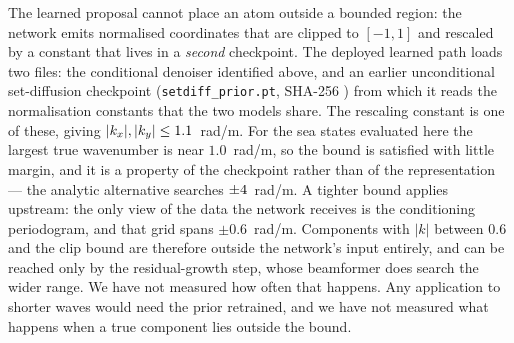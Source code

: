 \documentclass[review]{elsarticle}
\begin{document}
The learned proposal cannot place an atom outside a bounded region: the network
emits normalised coordinates that are clipped to $[-1,1]$ and rescaled by a
constant that lives in a \emph{second} checkpoint. The deployed learned path loads
two files: the conditional denoiser identified above, and an earlier unconditional
set-diffusion checkpoint (\texttt{setdiff\_prior.pt}, SHA-256
\texttt{\PriorCkptSha{}}) from which it reads the normalisation constants that the
two models share. The rescaling constant is one of these, giving
$|k_x|, |k_y| \le 1.1{}$~rad/m. For
the sea states evaluated here the largest true wavenumber is near $1.0$~rad/m, so
the bound is satisfied with little margin, and it is a property of the checkpoint
rather than of the representation --- the analytic alternative searches
$\pm 4{}$~rad/m.
A tighter bound applies upstream: the only view of the data the network receives is
the conditioning periodogram, and that grid spans $\pm 0.6$~rad/m. Components with
$|k|$ between $0.6$ and the clip bound are therefore outside the network's input
entirely, and can be reached only by the residual-growth step, whose beamformer does
search the wider range. We have not measured how often that happens. Any application to shorter waves would need the prior retrained,
and we have not measured what happens when a true component lies outside the
bound.
\end{document}
